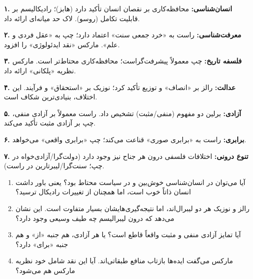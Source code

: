 \vspace{4pt}

\begin{summarybox}
	
	\textbf{۱. انسان‌شناسی:} محافظه‌کاری بر نقصان انسان تأکید دارد (هابز)؛ رادیکالیسم بر قابلیت تکامل (روسو). لاک حد میانه‌ای ارائه داد.
	
	\textbf{۲. معرفت‌شناسی:} راست به «خرد جمعی سنت» اعتماد دارد؛ چپ به «عقل فردی و علم». مارکس «نقد ایدئولوژی» را افزود.
	
	\textbf{۳. فلسفه تاریخ:} چپ معمولاً پیشرفت‌گراست؛ محافظه‌کاری محتاط‌تر است. مارکس نظریه «پلکانی» ارائه داد.
	
	\textbf{۴. عدالت:} رالز بر «انصاف» و توزیع تأکید کرد؛ نوزیک بر «استحقاق» و فرآیند. این اختلاف، بنیادی‌ترین شکاف است.
	
	\textbf{۵. آزادی:} برلین دو مفهوم (منفی/مثبت) تشخیص داد. راست معمولاً بر آزادی منفی، چپ بر آزادی مثبت تأکید می‌کند.
	
	\textbf{۶. برابری:} راست به «برابری صوری» قناعت می‌کند؛ چپ «برابری واقعی» می‌خواهد.
	
	\textbf{۷. تنوع درونی:} اختلافات فلسفی درون هر جناح نیز وجود دارد (دولت‌گرا/آزادی‌خواه در چپ؛ سنت‌گرا/لیبرتارین در راست).
	
\end{summarybox}

\vspace{2pt}

\begin{questionbox}
	
	\begin{enumerate}[nosep, rightmargin=1cm]
		\item آیا می‌توان در انسان‌شناسی خوش‌بین و در سیاست محتاط بود؟ یعنی باور داشت انسان ذاتاً خوب است، اما همچنان از تغییرات رادیکال ترسید؟
		
		\item رالز و نوزیک هر دو لیبرال‌اند، اما نتیجه‌گیری‌هایشان بسیار متفاوت است. این نشان می‌دهد که درون لیبرالیسم چه طیف وسیعی وجود دارد؟
		
		\item آیا تمایز آزادی منفی و مثبت واقعاً قاطع است؟ یا هر آزادی، هم جنبه «از» و هم جنبه «برای» دارد؟
		
		\item مارکس می‌گفت ایده‌ها بازتاب منافع طبقاتی‌اند. آیا این نقد شامل خود نظریه مارکس هم می‌شود؟
	\end{enumerate}
	
\end{questionbox}

